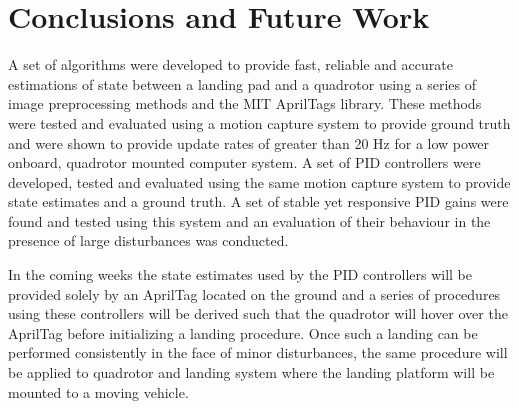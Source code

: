 \documentclass[11pt, twocolumn]{article}
\begin{document}
\section{Conclusions and Future Work}
A set of algorithms were developed to provide fast, reliable and accurate estimations of state between a landing pad and a quadrotor using a series of image preprocessing methods and the MIT AprilTags library. These methods were tested and evaluated using a motion capture system to provide ground truth and were shown to provide update rates of greater than 20 Hz for a low power onboard, quadrotor mounted computer system. A set of PID controllers were developed, tested and evaluated using the same motion capture system to provide state estimates and a ground truth. A set of stable yet responsive PID gains were found and tested using this system and an evaluation of their behaviour in the presence of large disturbances was conducted. 

In the coming weeks the state estimates used by the PID controllers will be provided solely by an AprilTag located on the ground and a series of procedures using these controllers will be derived such that the quadrotor will hover over the AprilTag before initializing a landing procedure. Once such a landing can be performed consistently in the face of minor disturbances, the same procedure will be applied to quadrotor and landing system where the landing platform will be mounted to a moving vehicle.

{}

\end{document}
